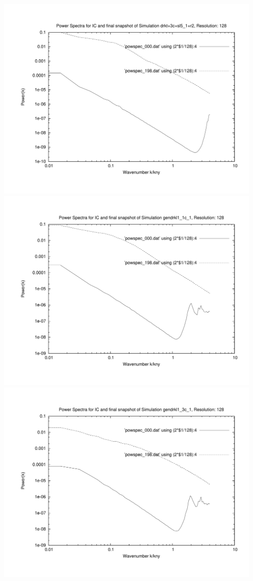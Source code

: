 \newpage

\includegraphics[scale=0.5]{r128/h100/drkt+3c+sl5_1+r2/plot_powspec_drkt+3c+sl5_1+r2.pdf} \\
\includegraphics[scale=0.5]{r128/h100/gendrkl1_1c_1/plot_powspec_gendrkl1_1c_1.pdf} \\
\includegraphics[scale=0.5]{r128/h100/gendrkl1_3c_1/plot_powspec_gendrkl1_3c_1.pdf}
